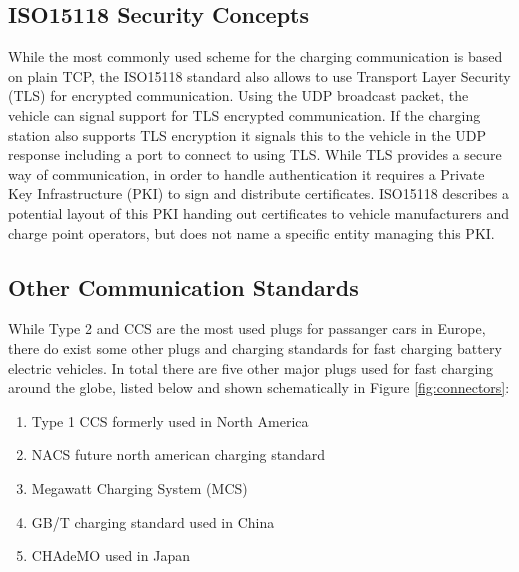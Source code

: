 \documentclass[conference,flushend]{iaria} %
\begin{document}

\subsection{ISO15118 Security Concepts} \label{sec:iso15118tls}
While the most commonly used scheme for the charging communication is based on plain TCP, the ISO15118 standard also allows to use Transport Layer Security (TLS) for encrypted communication.
Using the UDP broadcast packet, the vehicle can signal support for TLS encrypted communication.
If the charging station also supports TLS encryption it signals this to the vehicle in the UDP response including a port to connect to using TLS.
While TLS provides a secure way of communication, in order to handle authentication it requires a Private Key Infrastructure (PKI) to sign and distribute certificates.
ISO15118 describes a potential layout of this PKI handing out certificates to vehicle manufacturers and charge point operators, but does not name a specific entity managing this PKI.



\subsection{Other Communication Standards}
While Type 2 and CCS are the most used plugs for passanger cars in Europe, there do exist some other plugs and charging standards for fast charging battery electric vehicles.
In total there are five other major plugs used for fast charging around the globe, listed below and shown schematically in Figure \ref{fig:connectors}:

\begin{enumerate}
\item Type 1 CCS formerly used in North America
\item NACS future north american charging standard
\item Megawatt Charging System (MCS)
\item GB/T charging standard used in China
\item CHAdeMO used in Japan
\end{enumerate}
\end{document}
